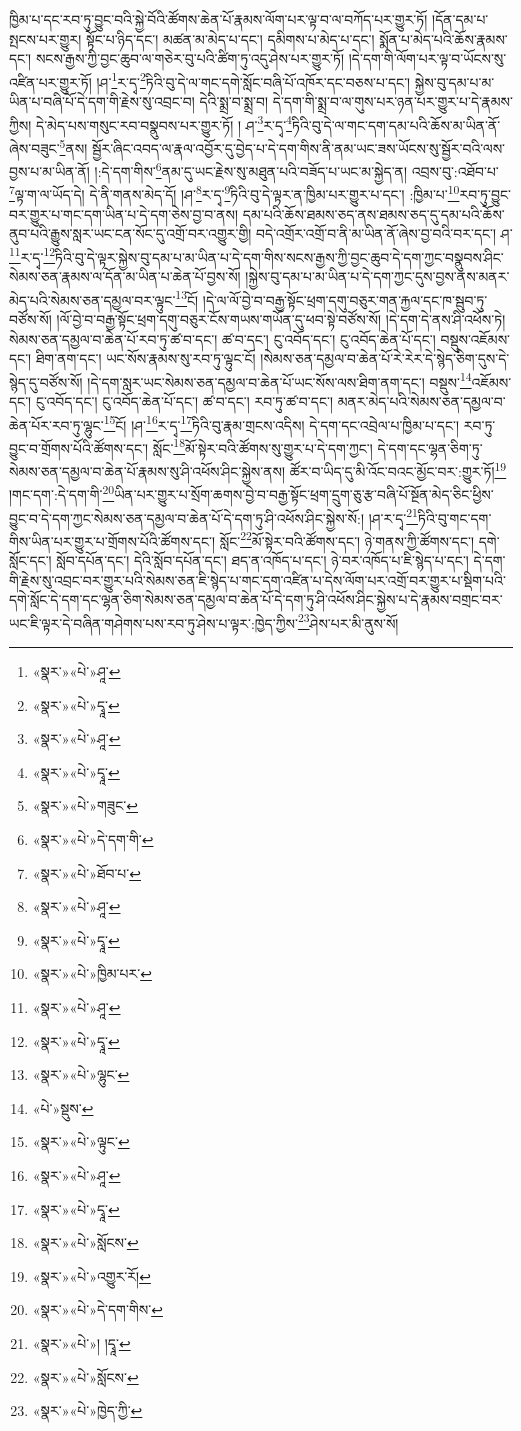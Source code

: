 ཁྱིམ་པ་དང་རབ་ཏུ་བྱུང་བའི་སྐྱེ་བོའི་ཚོགས་ཆེན་པོ་རྣམས་ལོག་པར་ལྟ་བ་ལ་བཀོད་པར་གྱུར་ཏོ། །དོན་དམ་པ་སྤངས་པར་གྱུར། སྟོང་པ་ཉིད་དང་། མཚན་མ་མེད་པ་དང་། དམིགས་པ་མེད་པ་དང་། སྨོན་པ་མེད་པའི་ཆོས་རྣམས་དང་། སངས་རྒྱས་ཀྱི་བྱང་ཆུབ་ལ་གཅེར་བུ་པའི་ཚིག་ཏུ་འདུ་ཤེས་པར་གྱུར་ཏོ། །དེ་དག་གི་ལོག་པར་ལྟ་བ་ཡོངས་སུ་འཛིན་པར་གྱུར་ཏོ། །ཤ་\footnote{«སྣར་»«པེ་»ཤཱ་}ར་དྭ་\footnote{«སྣར་»«པེ་»དྭཱ་}ཏིའི་བུ་དེ་ལ་གང་དགེ་སློང་བཞི་པོ་འཁོར་དང་བཅས་པ་དང་། སྐྱེས་བུ་དམ་པ་མ་ཡིན་པ་བཞི་པོ་དེ་དག་གི་རྗེས་སུ་འབྲང་བ། དེའི་སྨྲ་བ་སྨྲ་བ། དེ་དག་གི་སྨྲ་བ་ལ་གུས་པར་ཉན་པར་གྱུར་པ་དེ་རྣམས་ཀྱིས། དེ་མེད་པས་གསུང་རབ་བསྣུབས་པར་གྱུར་ཏོ། །
ཤ་\footnote{«སྣར་»«པེ་»ཤཱ་}ར་དྭ་\footnote{«སྣར་»«པེ་»དྭཱ་}ཏིའི་བུ་དེ་ལ་གང་དག་དམ་པའི་ཆོས་མ་ཡིན་ནོ་ཞེས་བཟུང་\footnote{«སྣར་»«པེ་»གཟུང་}ནས། སྦྱོར་ཞིང་འབད་ལ་རྣལ་འབྱོར་དུ་བྱེད་པ་དེ་དག་གིས་ནི་ནམ་ཡང་ཟས་ཡོངས་སུ་སྦྱོར་བའི་ལས་བྱས་པ་མ་ཡིན་ནོ། །:དེ་དག་གིས་\footnote{«སྣར་»«པེ་»དེ་དག་གི་}ནམ་དུ་ཡང་རྗེས་སུ་མཐུན་པའི་བཟོད་པ་ཡང་མ་སྐྱེད་ན། འབྲས་བུ་:འཐོབ་པ་\footnote{«སྣར་»«པེ་»ཐོབ་པ་}ལྟ་ག་ལ་ཡོད་དེ། དེ་ནི་གནས་མེད་དོ། །ཤ་\footnote{«སྣར་»«པེ་»ཤཱ་}ར་དྭ་\footnote{«སྣར་»«པེ་»དྭཱ་}ཏིའི་བུ་དེ་ལྟར་ན་ཁྱིམ་པར་གྱུར་པ་དང་། :ཁྱིམ་པ་\footnote{«སྣར་»«པེ་»ཁྱིམ་པར་}རབ་ཏུ་བྱུང་བར་གྱུར་པ་གང་དག་ཡིན་པ་དེ་དག་ཅེས་བྱ་བ་ནས། དམ་པའི་ཆོས་ཐམས་ཅད་ནས་ཐམས་ཅད་དུ་དམ་པའི་ཆོས་ནུབ་པའི་རྒྱུས་སླར་ཡང་ངན་སོང་དུ་འགྲོ་བར་འགྱུར་གྱི། བདེ་འགྲོར་འགྲོ་བ་ནི་མ་ཡིན་ནོ་ཞེས་བྱ་བའི་བར་དང་། ཤ་\footnote{«སྣར་»«པེ་»ཤཱ་}ར་དྭ་\footnote{«སྣར་»«པེ་»དྭཱ་}ཏིའི་བུ་དེ་ལྟར་སྐྱེས་བུ་དམ་པ་མ་ཡིན་པ་དེ་དག་གིས་སངས་རྒྱས་ཀྱི་བྱང་ཆུབ་དེ་དག་ཀྱང་བསྣུབས་ཤིང་སེམས་ཅན་རྣམས་ལ་དོན་མ་ཡིན་པ་ཆེན་པོ་བྱས་སོ། །སྐྱེས་བུ་དམ་པ་མ་ཡིན་པ་དེ་དག་ཀྱང་དུས་བྱས་ནས་མནར་མེད་པའི་སེམས་ཅན་དམྱལ་བར་ལྟུང་\footnote{«སྣར་»«པེ་»ལྷུང་}ངོ། །དེ་ལ་ལོ་བྱེ་བ་བརྒྱ་སྟོང་ཕྲག་དགུ་བཅུར་གན་རྐྱལ་དང་ཁ་སྦུབ་ཏུ་བཙོས་སོ། །ལོ་བྱེ་བ་བརྒྱ་སྟོང་ཕྲག་དགུ་བཅུར་ངོས་གཡས་གཡོན་དུ་ཕབ་སྟེ་བཙོས་སོ། །དེ་དག་དེ་ནས་ཤི་འཕོས་ཏེ། སེམས་ཅན་དམྱལ་བ་ཆེན་པོ་རབ་ཏུ་ཚ་བ་དང་། ཚ་བ་དང་། ངུ་འབོད་དང་། ངུ་འབོད་ཆེན་པོ་དང་། བསྡུས་འཇོམས་དང་། ཐིག་ནག་དང་། ཡང་སོས་རྣམས་སུ་རབ་ཏུ་ལྟུང་ངོ། །སེམས་ཅན་དམྱལ་བ་ཆེན་པོ་རེ་རེར་དེ་སྙེད་ཅིག་དུས་དེ་སྙེད་དུ་བཙོས་སོ། །དེ་དག་སླར་ཡང་སེམས་ཅན་དམྱལ་བ་ཆེན་པོ་ཡང་སོས་ལས་ཐིག་ནག་དང་། བསྡུས་\footnote{«པེ་»སྡུས་}འཇོམས་དང་། ངུ་འབོད་དང་། ངུ་འབོད་ཆེན་པོ་དང་། ཚ་བ་དང་། རབ་ཏུ་ཚ་བ་དང་། མནར་མེད་པའི་སེམས་ཅན་དམྱལ་བ་ཆེན་པོར་རབ་ཏུ་ལྷུང་\footnote{«སྣར་»«པེ་»ལྟུང་}ངོ། །ཤ་\footnote{«སྣར་»«པེ་»ཤཱ་}ར་དྭ་\footnote{«སྣར་»«པེ་»དྭཱ་}ཏིའི་བུ་རྣམ་གྲངས་འདིས། དེ་དག་དང་འབྲེལ་པ་ཁྱིམ་པ་དང་། རབ་ཏུ་བྱུང་བ་གྲོགས་པོའི་ཚོགས་དང་། སློང་\footnote{«སྣར་»«པེ་»སློངས་}མོ་སྟེར་བའི་ཚོགས་སུ་གྱུར་པ་དེ་དག་ཀྱང་། དེ་དག་དང་ལྷན་ཅིག་ཏུ་སེམས་ཅན་དམྱལ་བ་ཆེན་པོ་རྣམས་སུ་ཤི་འཕོས་ཤིང་སྐྱེས་ནས། ཚོར་བ་ཡིད་དུ་མི་འོང་བའང་མྱོང་བར་:གྱུར་ཏོ།\footnote{«སྣར་»«པེ་»འགྱུར་རོ།} །གང་དག་:དེ་དག་གི་\footnote{«སྣར་»«པེ་»དེ་དག་གིས་}ཡིན་པར་གྱུར་པ་སྲོག་ཆགས་བྱེ་བ་བརྒྱ་སྟོང་ཕྲག་དྲུག་ཅུ་རྩ་བཞི་པོ་སྔོན་མེད་ཅིང་ཕྱིས་བྱུང་བ་དེ་དག་ཀྱང་སེམས་ཅན་དམྱལ་བ་ཆེན་པོ་དེ་དག་ཏུ་ཤི་འཕོས་ཤིང་སྐྱེས་སོ:། །ཤ་ར་དྭ་\footnote{«སྣར་»«པེ་»། །དྭཱ་}ཏིའི་བུ་གང་དག་གིས་ཡིན་པར་གྱུར་པ་གྲོགས་པོའི་ཚོགས་དང་། སློང་\footnote{«སྣར་»«པེ་»སློངས་}མོ་སྟེར་བའི་ཚོགས་དང་། ཉེ་གནས་ཀྱི་ཚོགས་དང་། དགེ་སློང་དང་། སློབ་དཔོན་དང་། དེའི་སློབ་དཔོན་དང་། ཐད་ན་འཁོད་པ་དང་། ཉེ་བར་འཁོད་པ་ཇི་སྙེད་པ་དང་། དེ་དག་གི་རྗེས་སུ་འབྲང་བར་གྱུར་པའི་སེམས་ཅན་ཇི་སྙེད་པ་གང་དག་འཛིན་པ་དེས་ལོག་པར་འགྲོ་བར་གྱུར་པ་སྡིག་པའི་དགེ་སློང་དེ་དག་དང་ལྷན་ཅིག་སེམས་ཅན་དམྱལ་བ་ཆེན་པོ་དེ་དག་ཏུ་ཤི་འཕོས་ཤིང་སྐྱེས་པ་དེ་རྣམས་བགྲང་བར་ཡང་ཇི་ལྟར་དེ་བཞིན་གཤེགས་པས་རབ་ཏུ་ཤེས་པ་ལྟར་:ཁྱེད་ཀྱིས་\footnote{«སྣར་»«པེ་»ཁྱེད་ཀྱི་}ཤེས་པར་མི་ནུས་སོ། 